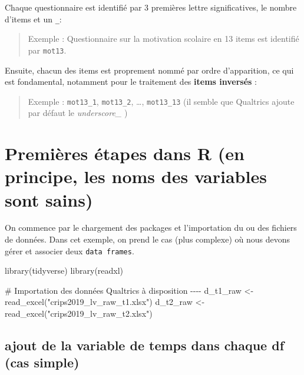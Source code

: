 \documentclass[
  letterpaper,
  DIV=11,
  numbers=noendperiod]{scrreprt}
\newenvironment{Shaded}{\begin{snugshade}}{\end{snugshade}}
\newcommand{\CommentTok}[1]{\textcolor[rgb]{0.37,0.37,0.37}{#1}}
\newcommand{\FunctionTok}[1]{\textcolor[rgb]{0.28,0.35,0.67}{#1}}
\newcommand{\NormalTok}[1]{\textcolor[rgb]{0.00,0.23,0.31}{#1}}
\newcommand{\OtherTok}[1]{\textcolor[rgb]{0.00,0.23,0.31}{#1}}
\newcommand{\StringTok}[1]{\textcolor[rgb]{0.13,0.47,0.30}{#1}}
\begin{document}
Chaque questionnaire est identifié par 3 premières lettre
significatives, le nombre d'items et un \texttt{\_}:

\begin{quote}
Exemple : Questionnaire sur la motivation scolaire en 13 items est
identifié par \texttt{mot13}.
\end{quote}

Ensuite, chacun des items est proprement nommé par ordre d'apparition,
ce qui est fondamental, notamment pour le traitement des \textbf{items
inversés} :

\begin{quote}
Exemple : \texttt{mot13\_1}, \texttt{mot13\_2}, \ldots,
\texttt{mot13\_13} (il semble que Qualtrics ajoute par défaut le
\emph{underscore\_} )
\end{quote}

\hypertarget{premiuxe8res-uxe9tapes-dans-r-en-principe-les-noms-des-variables-sont-sains}{%
\section{Premières étapes dans R (en principe, les noms des variables
sont
sains)}\label{premiuxe8res-uxe9tapes-dans-r-en-principe-les-noms-des-variables-sont-sains}}

On commence par le chargement des packages et l'importation du ou des
fichiers de données. Dans cet exemple, on prend le cas (plus complexe)
où nous devons gérer et associer deux \texttt{data\ frames}.

\begin{Shaded}
\begin{Highlighting}[]
\FunctionTok{library}\NormalTok{(tidyverse)}
\FunctionTok{library}\NormalTok{(readxl)}

\CommentTok{\# Importation des données Qualtrics à disposition {-}{-}{-}{-}}
\NormalTok{d\_t1\_raw }\OtherTok{\textless{}{-}} \FunctionTok{read\_excel}\NormalTok{(}\StringTok{"crips2019\_lv\_raw\_t1.xlsx"}\NormalTok{)}
\NormalTok{d\_t2\_raw }\OtherTok{\textless{}{-}} \FunctionTok{read\_excel}\NormalTok{(}\StringTok{"crips2019\_lv\_raw\_t2.xlsx"}\NormalTok{)}
\end{Highlighting}
\end{Shaded}

\hypertarget{ajout-de-la-variable-de-temps-dans-chaque-df-cas-simple}{%
\subsection{ajout de la variable de temps dans chaque df (cas
simple)}\label{ajout-de-la-variable-de-temps-dans-chaque-df-cas-simple}}
\end{document}
